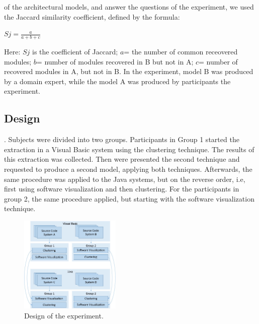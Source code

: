 \documentclass{sig-alternate-05-2015}
\begin{document}
 of the  architectural models, 
and answer the questions of the experiment, we used the 
Jaccard similarity coefficient, defined by the formula:

\begin{center}
	$Sj= \frac{a}{a+b+c}$
\end{center}

Here: $Sj$ is the coefficient of Jaccard; $a$= the number of common receovered 
modules; $b$= number of modules recovered in B but not in A; $c$= number of recovered 
modules in A, but not in B. In the experiment, model B was produced by a domain expert, while the model 
A was produced by participants  the experiment.

\subsection{Design}%



. Subjects were divided into two groups. Participants in Group 1 started the extraction in a Visual Basic system using the clustering technique. The results of this extraction was collected. Then were presented the second technique and requested to produce a second model, applying both techniques. Afterwards, the same procedure was applied to the Java systems, but on the reverse order, i.e, first using software visualization and then clustering. For the participants in group 2, the same procedure applied, but starting with the software visualization technique.

\begin{figure}[!h]
	\centering
	\includegraphics[width=0.43\textwidth]{design_experimento}
	\caption{Design of the experiment.}
	\label{design_experimento}
\end{figure}
\end{document}
